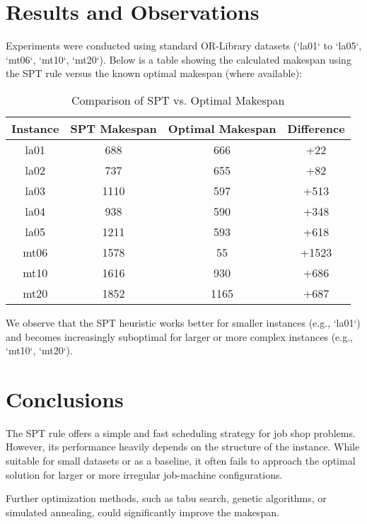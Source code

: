 \documentclass[12pt]{article}
\begin{document}
\section{Results and Observations}

Experiments were conducted using standard OR-Library datasets (`la01` to `la05`, `mt06`, `mt10`, `mt20`). Below is a table showing the calculated makespan using the SPT rule versus the known optimal makespan (where available):

\begin{table}[H]
\centering
\begin{tabular}{|c|c|c|c|}
\hline
Instance & SPT Makespan & Optimal Makespan & Difference \\
\hline
la01 & 688 & 666 & +22 \\
la02 & 737 & 655 & +82 \\
la03 & 1110 & 597 & +513 \\
la04 & 938 & 590 & +348 \\
la05 & 1211 & 593 & +618 \\
mt06 & 1578 & 55 & +1523 \\
mt10 & 1616 & 930 & +686 \\
mt20 & 1852 & 1165 & +687 \\
\hline
\end{tabular}
\caption{Comparison of SPT vs. Optimal Makespan}
\end{table}

We observe that the SPT heuristic works better for smaller instances (e.g., `la01`) and becomes increasingly suboptimal for larger or more complex instances (e.g., `mt10`, `mt20`).

\section{Conclusions}

The SPT rule offers a simple and fast scheduling strategy for job shop problems. However, its performance heavily depends on the structure of the instance. While suitable for small datasets or as a baseline, it often fails to approach the optimal solution for larger or more irregular job-machine configurations.

Further optimization methods, such as tabu search, genetic algorithms, or simulated annealing, could significantly improve the makespan.
\end{document}

